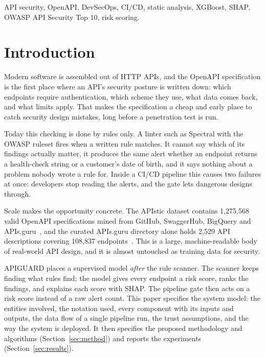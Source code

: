 \documentclass[conference]{IEEEtran}
\begin{document}
\begin{IEEEkeywords}
API security, OpenAPI, DevSecOps, CI/CD, static analysis, XGBoost, SHAP, OWASP API Security
Top 10, risk scoring.
\end{IEEEkeywords}

\section{Introduction}
Modern software is assembled out of HTTP APIs, and the OpenAPI specification is the first
place where an API's security posture is written down: which endpoints require
authentication, which scheme they use, what data comes back, and what limits apply. That
makes the specification a cheap and early place to catch security design mistakes, long
before a penetration test is run.

Today this checking is done by rules only. A linter such as Spectral with the OWASP ruleset
fires when a written rule matches. It cannot say which of its findings actually matter, it
produces the same alert whether an endpoint returns a health-check string or a customer's
date of birth, and it says nothing about a problem nobody wrote a rule for. Inside a CI/CD
pipeline this causes two failures at once: developers stop reading the alerts, and the gate
lets dangerous designs through.

Scale makes the opportunity concrete. The APIstic dataset contains 1{,}275{,}568 valid
OpenAPI specifications mined from GitHub, SwaggerHub, BigQuery and APIs.guru~\cite{apistic},
and the curated APIs.guru directory alone holds 2{,}529 API descriptions covering 108{,}837
endpoints~\cite{apisguru}. This is a large, machine-readable body of real-world API design,
and it is almost untouched as training data for security.

APIGUARD places a supervised model \emph{after} the rule scanner. The scanner keeps finding
what rules find; the model gives every endpoint a risk score, ranks the findings, and
explains each score with SHAP. The pipeline gate then acts on a risk score instead of a raw
alert count. This paper specifies the system model: the entities involved, the notation
used, every component with its inputs and outputs, the data flow of a single pipeline run,
the trust assumptions, and the way the system is deployed. It then specifies the proposed
methodology and algorithms (Section~\ref{sec:method}) and reports the experiments (Section~\ref{sec:results}).
\end{document}

